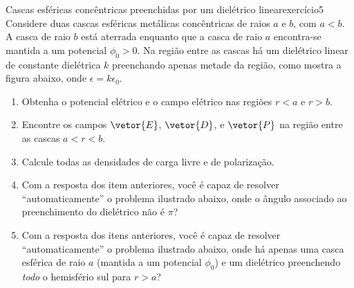 \begin{exercício}{Cascas esféricas concêntricas preenchidas por um dielétrico linear}{exercício5}
    Considere duas cascas esféricas metálicas concêntricas de raios \(a\) e \(b\), com \(a < b\). A casca de raio \(b\) está aterrada enquanto que a casca de raio \(a\) encontra-se mantida a um potencial \(\phi_0 > 0\). Na região entre as cascas há um dielétrico linear de constante dielétrica \(k\) preenchando apenas metade da região, como mostra a figura abaixo, onde \(\epsilon = k \epsilon_0\).

    \begin{center}
    \end{center}

    \begin{enumerate}[label=(\alph*)]
        \item Obtenha o potencial elétrico e o campo elétrico nas regiões \(r < a\) e \(r > b\).
        \item Encontre os campos \(\vetor{E}\), \(\vetor{D}\), e \(\vetor{P}\) na região entre as cascas \(a < r < b\).
        \item Calcule todas as densidades de carga livre e de polarização.
        \item Com a resposta dos item anteriores, você é capaz de resolver \enquote{automaticamente} o problema ilustrado abaixo, onde o ângulo associado ao preenchimento do dielétrico não é \(\pi\)?
        \item Com a resposta dos itens anteriores, você é capaz de resolver \enquote{automaticamente} o problema ilustrado abaixo, onde há apenas uma casca esférica de raio \(a\) (mantida a um potencial \(\phi_0\)) e um dielétrico preenchendo \emph{todo} o hemisfério sul para \(r > a\)?
    \end{enumerate}
        \begin{center}
\end{center}
\end{exercício}
